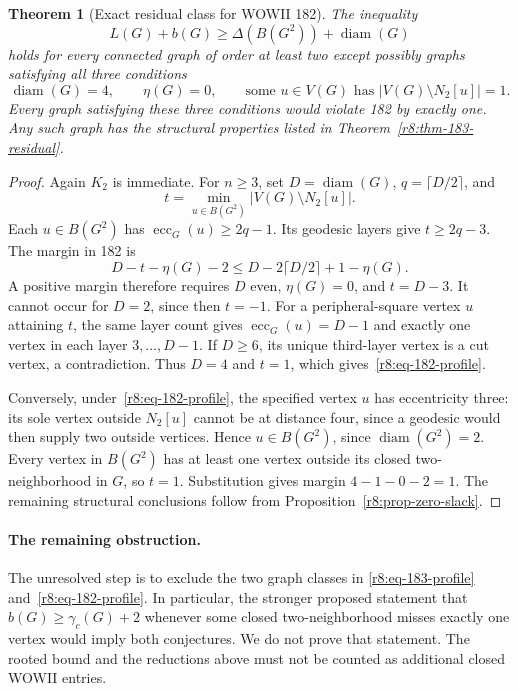\documentclass[11pt,a4paper]{article}
\newtheorem{theorem}{Theorem}[section]
\theoremstyle{remark}
\begin{document}
\begin{theorem}[Exact residual class for WOWII 182]
\label{r8:thm-182-residual}
The inequality
\[
 L(G)+b(G)\ge\Delta(B(G^2))+\operatorname{diam}(G)
\]
holds for every connected graph of order at least two except possibly
graphs satisfying all three conditions
\begin{equation}\label{r8:eq-182-profile}
 \operatorname{diam}(G)=4,\qquad
 \eta(G)=0,\qquad
 \text{some }u\in V(G)\text{ has }|V(G)\setminus N_2[u]|=1.
\end{equation}
Every graph satisfying these three conditions would violate 182 by
exactly one.  Any such graph has the structural properties listed in
Theorem~\ref{r8:thm-183-residual}.
\end{theorem}
\begin{proof}
Again $K_2$ is immediate.  For $n\ge3$, set
$D=\operatorname{diam}(G)$, $q=\lceil D/2\rceil$, and
\[
 t=\min_{u\in B(G^2)}|V(G)\setminus N_2[u]|.
\]
Each $u\in B(G^2)$ has $\operatorname{ecc}_G(u)\ge2q-1$.
Its geodesic layers give $t\ge2q-3$.  The margin in 182 is
\[
 D-t-\eta(G)-2\le D-2\lceil D/2\rceil+1-\eta(G).
\]
A positive margin therefore requires $D$ even, $\eta(G)=0$, and
$t=D-3$.  It cannot occur for $D=2$, since then $t=-1$.
For a peripheral-square vertex $u$ attaining $t$, the same layer
count gives $\operatorname{ecc}_G(u)=D-1$ and exactly one vertex in
each layer $3,\ldots,D-1$.  If $D\ge6$, its unique third-layer
vertex is a cut vertex, a contradiction.  Thus $D=4$ and $t=1$,
which gives~\eqref{r8:eq-182-profile}.

Conversely, under~\eqref{r8:eq-182-profile}, the specified vertex $u$
has eccentricity three: its sole vertex outside $N_2[u]$ cannot be
at distance four, since a geodesic would then supply two outside
vertices.  Hence $u\in B(G^2)$, since $\operatorname{diam}(G^2)=2$.
Every vertex in $B(G^2)$ has at least one vertex outside its closed
two-neighborhood in $G$, so $t=1$.  Substitution gives margin
$4-1-0-2=1$.  The remaining structural conclusions follow from
Proposition~\ref{r8:prop-zero-slack}.
\end{proof}

\paragraph{The remaining obstruction.}
The unresolved step is to exclude the two graph classes in
\eqref{r8:eq-183-profile} and~\eqref{r8:eq-182-profile}.  In particular,
the stronger proposed statement that
$b(G)\ge\gamma_c(G)+2$ whenever some closed two-neighborhood misses
exactly one vertex would imply both conjectures.  We do not prove
that statement.  The rooted bound and the reductions above must not
be counted as additional closed WOWII entries.
\end{document}
